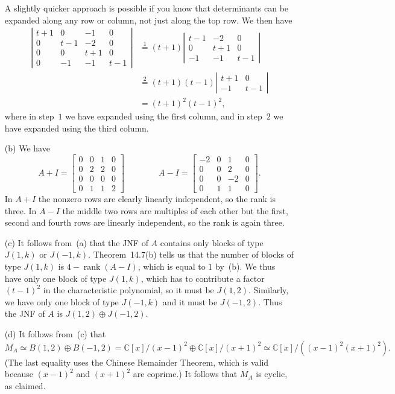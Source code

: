\documentclass{amsart}
\newcommand{\bbm}       {\left[\begin{matrix}}
\newcommand{\ebm}       {\end{matrix}\right]}
\newcommand{\rank}      {\operatorname{rank}}
\newcommand{\C}         {{\mathbb{C}}}
\newcommand{\op}        {\oplus}
\renewcommand{\:}{\colon}
\theoremstyle{definition}
\renewenvironment{solution}{\SolutionAtEnd}{\endSolutionAtEnd}
\begin{document}
\begin{solution}
\begin{itemize}
   A slightly quicker approach is possible if you know that
   determinants can be expanded along any row or column, not just
   along the top row.  We then have
   \begin{align*}
       \left|\begin{array}{cccc} 
        t+1 & 0   & -1  & 0 \\
        0   & t-1 & -2  & 0 \\
        0   & 0   & t+1 & 0 \\
        0   & -1  & -1  & t-1
      \end{array}\right| &\stackrel{1}{=}
       (t+1)\left| \begin{array}{ccc}
             t-1 & -2 & 0 \\ 0 & t+1 & 0 \\ -1 & -1 & t-1 
        \end{array} \right| \\ & \stackrel{2}{=}
       (t+1)(t-1)\left| \begin{array}{cc}
             t+1 & 0 \\ -1 & t-1 
            \end{array} \right| \\
       &= (t+1)^2(t-1)^2,
   \end{align*}
   where in step~$1$ we have expanded using the first column, and in
   step~$2$ we have expanded using the third column.

  \item[(b)] We have
   \[ A+I = \bbm 0&0&1&0\\0&2&2&0\\0&0&0&0\\0&1&1&2 \ebm \hspace{4em}
      A-I = \bbm -2&0&1&0\\0&0&2&0\\0&0&-2&0\\0&1&1&0\ebm.
   \]
   In $A+I$ the nonzero rows are clearly linearly independent, so the
   rank is three.  In $A-I$ the middle two rows are multiples of each
   other but the first, second and fourth rows are linearly
   independent, so the rank is again three.

  \item[(c)] It follows from~(a) that the JNF of $A$ contains only
   blocks of type $J(1,k)$ or $J(-1,k)$.  Theorem~14.7(b) tells us
   that the number of blocks of type $J(1,k)$ is $4-\rank(A-I)$, which
   is equal to $1$ by~(b).  We thus have only one block of type
   $J(1,k)$, which has to contribute a factor $(t-1)^2$ in the
   characteristic polynomial, so it must be $J(1,2)$.  Similarly, we
   have only one block of type $J(-1,k)$ and it must be $J(-1,2)$.
   Thus the JNF of $A$ is $J(1,2)\op J(-1,2)$.

  \item[(d)] It follows from~(c) that 
   \[ M_A\simeq B(1,2)\op B(-1,2) =
       \C[x]/(x-1)^2\op\C[x]/(x+1)^2\simeq \C[x]/((x-1)^2(x+1)^2).
   \]
   (The last equality uses the Chinese Remainder Theorem, which is
   valid because $(x-1)^2$ and $(x+1)^2$ are coprime.)  It follows
   that $M_A$ is cyclic, as claimed.
 \end{itemize}
\end{solution}
\end{document}
